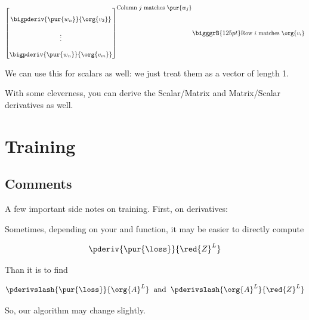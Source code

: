 \begin{equation}
{\begin{bmatrix}
\begin{matrix}
                            \\
                            \bigpderiv{ \pur{w_n} }   { \org{v_2} }\\ 
                            \\
                            \vdots \\ 
                            \\
                            \bigpderiv{ \pur{w_n} }   { \org{v_m} }
                        \end{matrix}
                    \end{bmatrix}
                }^{ \text{\small Column $j$ matches $\pur{w_j}$} }
                \bigggrB{125pt} \text{\small Row $i$ matches $\org{v_i}$} 
            \end{equation}
            
            We can use this for scalars as well: we just treat them as a vector of length 1.
            
            With some cleverness, you can derive the Scalar/Matrix and Matrix/Scalar derivatives as well.  
        
            \secdiv

\pagebreak
        


        
        
\pagebreak
\section{Training}
    \label{training}
    
    \subsection{Comments}
    
        A few important side notes on training. First, on derivatives:\\
        
        \begin{concept}
            Sometimes, depending on your  and  function, it may be easier to directly compute
            
            \begin{equation*}
                \pderiv{ \pur{\loss} }{ \red{Z}^{L} }
            \end{equation*}
            
            Than it is to find 
            
            \begin{equation*}
                \pderivslash{ \pur{\loss} }{ \org{A}^L } 
                \;\;
                \text{and}
                \;\;
                \pderivslash{ \org{A}^L } { \red{Z}^{L} }
            \end{equation*}
            
            So, our algorithm may change slightly.
        \end{concept}
        
